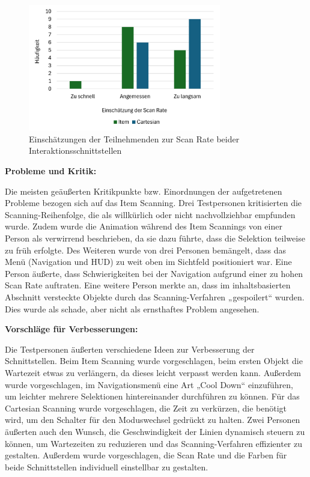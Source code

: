\begin{figure}[tbh]
    \centering
    \includegraphics[width=0.75\textwidth]{images/Results/ScanRate.png}
    \caption{Einschätzungen der Teilnehmenden zur Scan Rate beider Interaktionsschnittstellen}
    \label{fig:scanrate}
\end{figure}

\textbf{Probleme und Kritik:}

Die meisten geäußerten Kritikpunkte bzw. Einordnungen der aufgetretenen Probleme bezogen sich auf das Item Scanning. Drei Testpersonen kritisierten die Scanning-Reihenfolge, die als willkürlich oder nicht nachvollziehbar empfunden wurde. Zudem wurde die Animation während des Item Scannings von einer Person als verwirrend beschrieben, da sie dazu führte, dass die Selektion teilweise zu früh erfolgte. Des Weiteren wurde von drei Personen bemängelt, dass das Menü (Navigation und HUD) zu weit oben im Sichtfeld positioniert war. Eine Person äußerte, dass Schwierigkeiten bei der Navigation aufgrund einer zu hohen Scan Rate auftraten. Eine weitere Person merkte an, dass im inhaltsbasierten Abschnitt versteckte Objekte durch das Scanning-Verfahren „gespoilert“ wurden. Dies wurde als schade, aber nicht als ernsthaftes Problem angesehen. 

\textbf{Vorschläge für Verbesserungen:}

Die Testpersonen äußerten verschiedene Ideen zur Verbesserung der Schnittstellen. Beim Item Scanning wurde vorgeschlagen, beim ersten Objekt die Wartezeit etwas zu verlängern, da dieses leicht verpasst werden kann. Außerdem wurde vorgeschlagen, im Navigationsmenü eine Art „Cool Down“ einzuführen, um leichter mehrere Selektionen hintereinander durchführen zu können. Für das Cartesian Scanning wurde vorgeschlagen, die Zeit zu verkürzen, die benötigt wird, um den Schalter für den Moduswechsel gedrückt zu halten. Zwei Personen äußerten auch den Wunsch, die Geschwindigkeit der Linien dynamisch steuern zu können, um Wartezeiten zu reduzieren und das Scanning-Verfahren effizienter zu gestalten. Außerdem wurde vorgeschlagen, die Scan Rate und die Farben für beide Schnittstellen individuell einstellbar zu gestalten.

